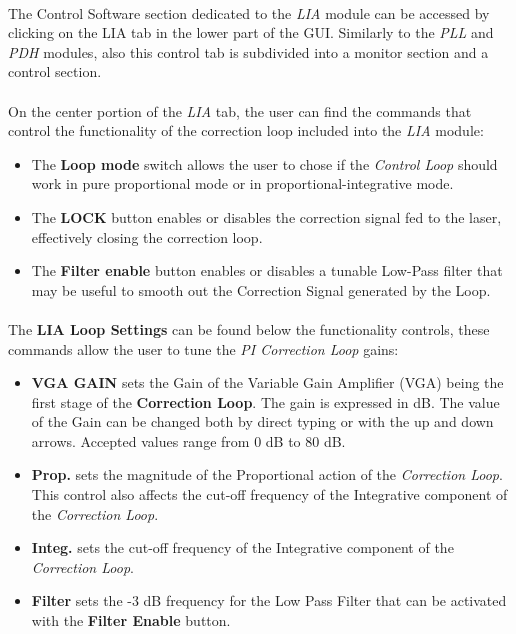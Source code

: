 \paragraph{} The \QubeModel  Control Software section dedicated to the \textit{LIA} module can be accessed by clicking on the LIA tab in the lower part of the GUI. Similarly to the \textit{PLL} and \textit{PDH} modules, also this control tab is subdivided into a monitor section and a control section.

\paragraph{} On the center portion of the \textit{LIA} tab, the user can find the commands that control the functionality of the correction loop included into the \textit{LIA} module:
\begin{itemize}
    \item The \textbf{Loop mode} switch allows the user to chose if the \textit{Control Loop} should work in pure proportional mode or in proportional-integrative mode.
    \item The \textbf{LOCK} button enables or disables the correction signal fed to the laser, effectively closing the correction loop.
    \item The \textbf{Filter enable} button enables or disables a tunable Low-Pass filter that may be useful to smooth out the Correction Signal generated by the Loop.
\end{itemize}

\paragraph{} The \textbf{LIA Loop Settings} can be found below the functionality controls, these commands allow the user to tune the \textit{PI Correction Loop} gains:
\begin{itemize}
    \item \textbf{VGA GAIN} sets the Gain of the Variable Gain Amplifier (VGA) being the first stage of the \textbf{Correction Loop}. The gain is expressed in dB. The value of the Gain can be changed both by direct typing or with the up and down arrows. Accepted values range from 0 dB to 80 dB.
    
    \item \textbf{Prop.} sets the magnitude of the Proportional action of the \textit{Correction Loop}. This control also affects the cut-off frequency of the Integrative component of the \textit{Correction Loop}.
    
    \item \textbf{Integ.} sets the cut-off frequency of the Integrative component of the \textit{Correction Loop}.
    
    \item \textbf{Filter} sets the -3 dB frequency for the Low Pass Filter that can be activated with the \textbf{Filter Enable} button.
\end{itemize}

